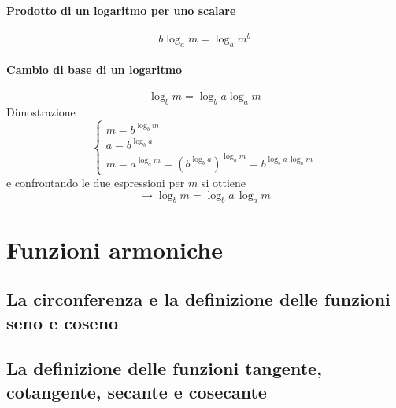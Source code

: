 \paragraph{Prodotto di un logaritmo per uno scalare}
\begin{equation}
  b \log_a m = \log_a m^{b}
\end{equation}
\paragraph{Cambio di base di un logaritmo}
\begin{equation}
     \log_b m = \log_b a \log_a m 
\end{equation}
Dimostrazione
\begin{equation}
\begin{cases}
    m = b^{\log_b m} \\
    a = b^{\log_b a} \\
    m = a^{\log_a m} = \left( b^{\log_b a} \right)^{\log_a m} = b^{\log_b a \, \log_a m}
\end{cases}
\end{equation}
e confrontando le due espressioni per $m$ si ottiene
\begin{equation}
    \rightarrow \log_b m = \log_b a \, \log_a m
\end{equation}

\section{Funzioni armoniche}
\subsection{La circonferenza e la definizione delle funzioni seno e coseno}

\subsection{La definizione delle funzioni tangente, cotangente, secante e cosecante}

